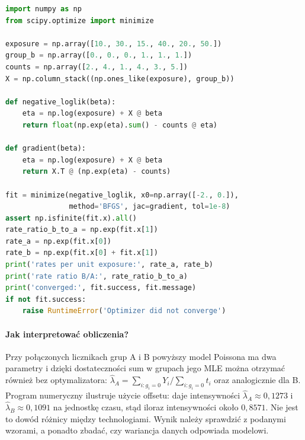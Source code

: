 \begin{lstlisting}[language=Python,caption={Kompletny program: MLE intensywności i offset w modelu Poissona (SciPy).}]
import numpy as np
from scipy.optimize import minimize

exposure = np.array([10., 30., 15., 40., 20., 50.])
group_b = np.array([0., 0., 0., 1., 1., 1.])
counts = np.array([2., 4., 1., 4., 3., 5.])
X = np.column_stack((np.ones_like(exposure), group_b))

def negative_loglik(beta):
    eta = np.log(exposure) + X @ beta
    return float(np.exp(eta).sum() - counts @ eta)

def gradient(beta):
    eta = np.log(exposure) + X @ beta
    return X.T @ (np.exp(eta) - counts)

fit = minimize(negative_loglik, x0=np.array([-2., 0.]),
               method='BFGS', jac=gradient, tol=1e-8)
assert np.isfinite(fit.x).all()
rate_ratio_b_to_a = np.exp(fit.x[1])
rate_a = np.exp(fit.x[0])
rate_b = np.exp(fit.x[0] + fit.x[1])
print('rates per unit exposure:', rate_a, rate_b)
print('rate ratio B/A:', rate_ratio_b_to_a)
print('converged:', fit.success, fit.message)
if not fit.success:
    raise RuntimeError('Optimizer did not converge')
\end{lstlisting}

\paragraph{Jak interpretować obliczenia?}
Przy połączonych licznikach grup A i B powyższy model
Poissona ma dwa parametry i dzięki dostateczności sum
w grupach jego MLE można otrzymać również bez optymalizatora:
$\widehat\lambda_A=\sum_{i:g_i=0}Y_i/
\sum_{i:g_i=0}t_i$ oraz analogicznie dla B.
Program numeryczny ilustruje użycie offsetu: daje intensywności
$\widehat\lambda_A\approx0{,}1273$ i
$\widehat\lambda_B\approx0{,}1091$ na jednostkę
czasu, stąd iloraz intensywności około $0{,}8571$.
Nie jest to dowód różnicy między technologiami.
Wynik należy sprawdzić z podanymi wzorami, a ponadto
zbadać, czy wariancja danych odpowiada modelowi.

